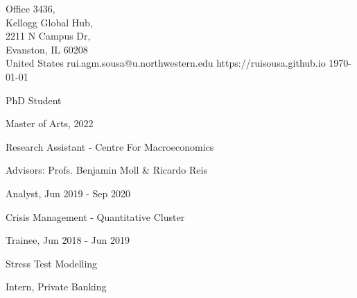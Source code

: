 \documentclass{practical-resume}
\begin{document}
\namehead

\begin{address}{
	Office 3436, \\
	Kellogg Global Hub, \\
	2211 N Campus Dr, \\
	Evanston, IL 60208 \\
	United States
}
{rui.agm.sousa@u.northwestern.edu}
{https://ruisousa.github.io}
{\today}
\end{address}

\begin{position}{PhD Student}{}
	\item Master of Arts, 2022
\end{position}


	\begin{position}{Research Assistant - }{Centre For Macroeconomics}
		\item Advisors: Profs. Benjamin Moll \& Ricardo Reis
	\end{position}


	\begin{position}{Analyst, }{Jun 2019 - Sep 2020}
		\item Crisis Management - Quantitative Cluster
	\end{position}
	\begin{position}{Trainee, }{Jun 2018 - Jun 2019}
		\item Stress Test Modelling
	\end{position}
		
	\begin{position}[noitemize]{Intern, }{Private Banking}
	\end{position}
	
	
	
\end{document}
